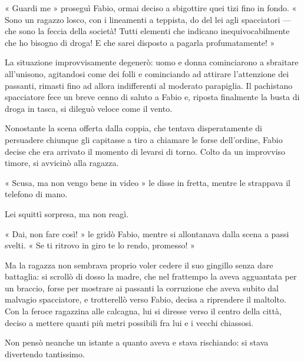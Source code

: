« Guardi me » proseguì Fabio, ormai deciso a sbigottire quei tizi fino in fondo. « Sono un ragazzo losco, con i lineamenti a teppista, do del lei agli spacciatori --- che sono la feccia della società! Tutti elementi che indicano inequivocabilmente che ho bisogno di droga! E che sarei disposto a pagarla profumatamente! »

La situazione improvvisamente degenerò: uomo e donna cominciarono a sbraitare all'unisono, agitandosi come dei folli e cominciando ad attirare l'attenzione dei passanti, rimasti fino ad allora indifferenti al moderato parapiglia. Il pachistano spacciatore fece un breve cenno di saluto a Fabio e, riposta finalmente la busta di droga in tasca, si dileguò veloce come il vento.

Nonostante la scena offerta dalla coppia, che tentava disperatamente di persuadere chiunque gli capitasse a tiro a chiamare le forse dell'ordine, Fabio decise che era arrivato il momento di levarsi di torno. Colto da un improvviso timore, si avvicinò alla ragazza.

« Scusa, ma non vengo bene in video » le disse in fretta, mentre le strappava il telefono di mano.

Lei squittì sorpresa, ma non reagì.

« Dai, non fare così! » le gridò Fabio, mentre si allontanava dalla scena a passi svelti. « Se ti ritrovo in giro te lo rendo, promesso! »

Ma la ragazza non sembrava proprio voler cedere il suo gingillo senza dare battaglia: si scrollò di dosso la madre, che nel frattempo la aveva agguantata per un braccio, forse per mostrare ai passanti la corruzione che aveva subito dal malvagio spacciatore, e trotterellò verso Fabio, decisa a riprendere il maltolto. Con la feroce ragazzina alle calcagna, lui si diresse verso il centro della città, deciso a mettere quanti più metri possibili fra lui e i vecchi chiassosi.

Non pensò neanche un istante a quanto aveva e stava rischiando: si stava divertendo tantissimo.
